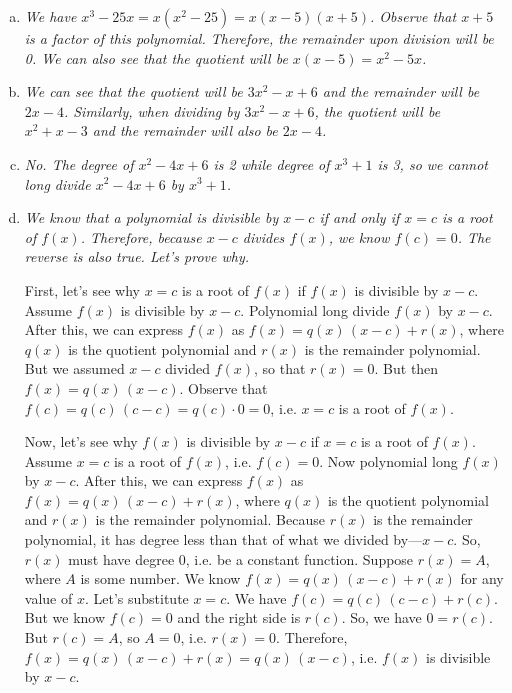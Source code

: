 \documentclass[11pt,letterpaper]{article}
\begin{document}
\begin{enumerate}[(a)]
\item {\itshape We have $x^3 - 25x= x(x^2 - 25)= x(x - 5)(x + 5)$. Observe that $x + 5$ is a factor of this polynomial. Therefore, the remainder upon division will be 0. We can also see that the quotient will be $x(x - 5)= x^2 - 5x$.}

\item {\itshape We can see that the quotient will be $3x^2 - x + 6$ and the remainder will be $2x - 4$. Similarly, when dividing by $3x^2 - x + 6$, the quotient will be $x^2 + x - 3$ and the remainder will also be $2x - 4$.}

\item {\itshape No. The degree of $x^2 - 4x + 6$ is 2 while degree of $x^3 + 1$ is 3, so we cannot long divide $x^2 - 4x + 6$ by $x^3 + 1$.}

\item {\itshape We know that a polynomial is divisible by $x - c$ if and only if $x= c$ is a root of $f(x)$. Therefore, because $x - c$ divides $f(x)$, we know $f(c)= 0$. The reverse is also true. Let's prove why. \par\vspace{0.3cm}

First, let's see why $x= c$ is a root of $f(x)$ if $f(x)$ is divisible by $x - c$. Assume $f(x)$ is divisible by $x - c$. Polynomial long divide $f(x)$ by $x - c$. After this, we can express $f(x)$ as $f(x)= q(x) \, (x - c) + r(x)$, where $q(x)$ is the quotient polynomial and $r(x)$ is the remainder polynomial. But we assumed $x - c$ divided $f(x)$, so that $r(x)= 0$. But then $f(x)= q(x) \, (x - c)$. Observe that $f(c)= q(c) \,(c - c)= q(c) \cdot 0= 0$, i.e. $x= c$ is a root of $f(x)$. \par\vspace{0.3cm}

Now, let's see why $f(x)$ is divisible by $x - c$ if $x= c$ is a root of $f(x)$. Assume $x= c$ is a root of $f(x)$, i.e. $f(c)= 0$. Now polynomial long $f(x)$ by $x - c$. After this, we can express $f(x)$ as $f(x)= q(x) \, (x - c) + r(x)$, where $q(x)$ is the quotient polynomial and $r(x)$ is the remainder polynomial. Because $r(x)$ is the remainder polynomial, it has degree less than that of what we divided by---$x - c$. So, $r(x)$ must have degree 0, i.e. be a constant function. Suppose $r(x)= A$, where $A$ is some number. We know $f(x)= q(x) \, (x - c) + r(x)$ for any value of $x$. Let's substitute $x= c$. We have $f(c)= q(c) \, (c - c) + r(c)$. But we know $f(c)= 0$ and the right side is $r(c)$. So, we have $0= r(c)$. But $r(c)= A$, so $A= 0$, i.e. $r(x)= 0$. Therefore, $f(x)= q(x) \, (x - c) + r(x)= q(x) \, (x - c)$, i.e. $f(x)$ is divisible by $x - c$.}
\end{enumerate}
\end{document}
